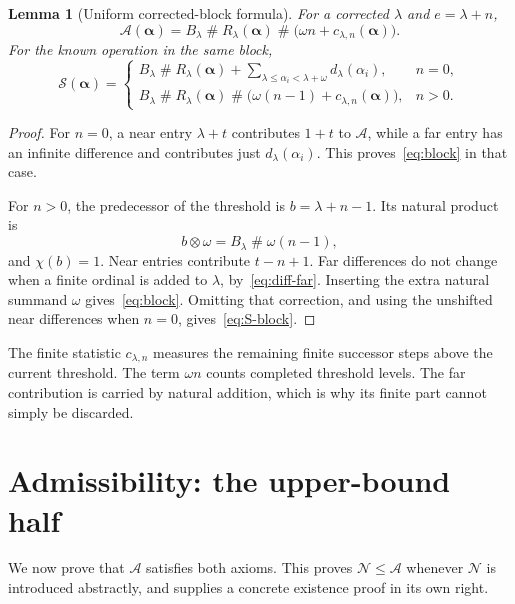 \documentclass[11pt,letterpaper]{article}
\newtheorem{lemma}[theorem]{Lemma}
\theoremstyle{definition}
\theoremstyle{remark}
\newcommand{\Nop}{\mathcal N}
\newcommand{\Sop}{\mathcal S}
\newcommand{\Aop}{\mathcal A}
\newcommand{\seq}[1]{\boldsymbol{#1}}
\newcommand{\ns}{\mathbin{\#}}
\newcommand{\np}{\mathbin{\otimes}}
\newcommand{\diff}[2]{d_{#1}(#2)}
\newcommand{\chip}{\chi}
\begin{document}
\begin{lemma}[Uniform corrected-block formula]\label{lem:block}
For a corrected $\lambda$ and $e=\lambda+n$,
\begin{equation}\label{eq:block}
 \Aop(\seq\alpha)=B_\lambda\ns R_\lambda(\seq\alpha)
             \ns\bigl(\omega n+c_{\lambda,n}(\seq\alpha)\bigr).
\end{equation}
For the known operation in the same block,
\begin{equation}\label{eq:S-block}
\Sop(\seq\alpha)=
\begin{cases}
 B_\lambda\ns R_\lambda(\seq\alpha)
       +\displaystyle\sum_{\lambda\le\alpha_i<\lambda+\omega}
          \diff\lambda{\alpha_i}, &n=0,\\[4pt]
 B_\lambda\ns R_\lambda(\seq\alpha)
       \ns\bigl(\omega(n-1)+c_{\lambda,n}(\seq\alpha)\bigr), &n>0.
\end{cases}
\end{equation}
\end{lemma}
\begin{proof}
For $n=0$, a near entry $\lambda+t$ contributes $1+t$ to $\Aop$, while a far entry has an infinite difference and contributes just $\diff\lambda{\alpha_i}$. This proves~\eqref{eq:block} in that case.

For $n>0$, the predecessor of the threshold is $b=\lambda+n-1$. Its natural product is
\[
 b\np\omega=B_\lambda\ns\omega(n-1),
\]
and $\chip(b)=1$. Near entries contribute $t-n+1$. Far differences do not change when a finite ordinal is added to $\lambda$, by~\eqref{eq:diff-far}. Inserting the extra natural summand $\omega$ gives~\eqref{eq:block}. Omitting that correction, and using the unshifted near differences when $n=0$, gives~\eqref{eq:S-block}.
\end{proof}

The finite statistic $c_{\lambda,n}$ measures the remaining finite successor steps above the current threshold. The term $\omega n$ counts completed threshold levels. The far contribution is carried by natural addition, which is why its finite part cannot simply be discarded.

\section{Admissibility: the upper-bound half}\label{sec:upper}

We now prove that $\Aop$ satisfies both axioms. This proves $\Nop\le\Aop$ whenever $\Nop$ is introduced abstractly, and supplies a concrete existence proof in its own right.
\end{document}
